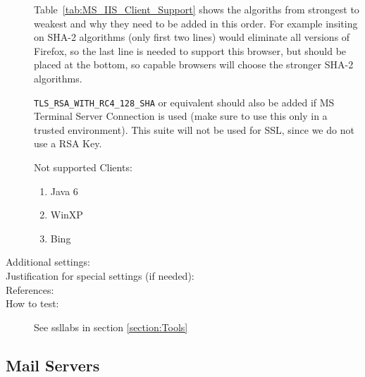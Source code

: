 \begin{description}
Table~\ref{tab:MS_IIS_Client_Support} shows the algoriths from
strongest to weakest and why they need to be added in this order. For
example insiting on SHA-2 algorithms (only first two lines) would
eliminate all versions of Firefox, so the last line is needed to
support this browser, but should be placed at the bottom, so capable
browsers will choose the stronger SHA-2 algorithms.

\verb|TLS_RSA_WITH_RC4_128_SHA| or equivalent should also be added if
MS Terminal Server Connection is used (make sure to use this only in a
trusted environment). This suite will not be used for SSL, since we do
not use a RSA Key.




Not supported Clients:
\begin{enumerate}
\item Java 6
\item WinXP
\item Bing
\end{enumerate}

\item[Additional settings:]


\item[Justification for special settings (if needed):]


\item[References:]



\item[How to test:] See ssllabs in section \ref{section:Tools}


\end{description}



\subsection{Mail Servers}

